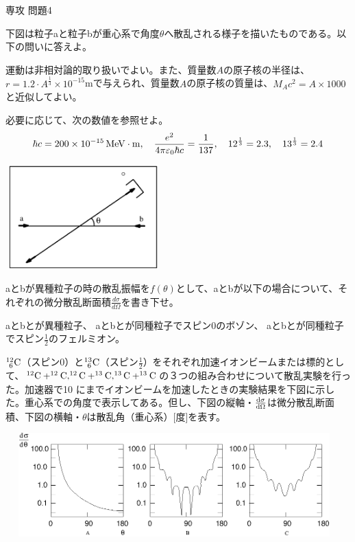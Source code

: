\documentclass[fleqn]{jbook}
\begin{document}
\begin{question}{専攻 問題4}{}

下図は粒子aと粒子bが重心系で角度$\theta$へ散乱される様子を描いたものである。以下の問いに答えよ。

運動は非相対論的取り扱いでよい。また、質量数$A$の原子核の半径は、$r=1.2\cdot A^{\frac{1}{3}}\times 10^{-15}$mで与えられ、質量数$A$の原子核の質量は、$M_A c^2=A\times 1000$ {}と近似してよい。

必要に応じて、次の数値を参照せよ。
\[ \hbar c = 200\times 10^{-15} {\rm{{\,{\rm MeV}}}}\cdot {\rm{m}}, \quad  \frac{e^2}{4\pi \varepsilon_0 \hbar c}=\frac{1}{137} , \quad 12^{\frac{1}{3}}=2.3 ,\quad 13^{\frac{1}{3}}=2.4 \]
\begin{center}
\includegraphics[clip,height=40mm,width=60mm]{1997phy4-1.eps}
\end{center}

\begin{subquestions}
\SubQuestion
aとbが異種粒子の時の散乱振幅を$f(\theta)$として、aとbが以下の場合について、それぞれの微分散乱断面積$\frac{d\sigma}{d\Omega}$を書き下せ。

\begin{subsubquestions}
\SubSubQuestion
aとbとが異種粒子、
\SubSubQuestion
aとbとが同種粒子でスピン0のボゾン、
\SubSubQuestion
aとbとが同種粒子でスピン$\frac{1}{2}$のフェルミオン。
\end{subsubquestions}

\SubQuestion
$_{\ 6}^{12}{\rm{C}}$（スピン0）と$^{13}_{\ 6}{\rm{C}}$（スピン$\frac{1}{2}$）をそれぞれ加速イオンビームまたは標的として、$^{12}{\rm{C}}+^{12}{\rm{C}}, ^{12}{\rm{C}}+^{13}{\rm{C}},^{13}{\rm{C}}+^{13}{\rm{C}}$の３つの組み合わせについて散乱実験を行った。加速器で10 {}にまでイオンビームを加速したときの実験結果を下図に示した。重心系での角度で表示してある。但し、下図の縦軸・${\frac{{\rm d} \sigma}{{\rm d} \Omega}}$は微分散乱断面積、下図の横軸・$\theta$は散乱角（重心系）[度]を表す。
\begin{center}
\includegraphics[clip,height=40mm,width=130mm]{1997phy4-2.eps}
\end{center}




\end{subquestions}
\end{question}
\end{document}

